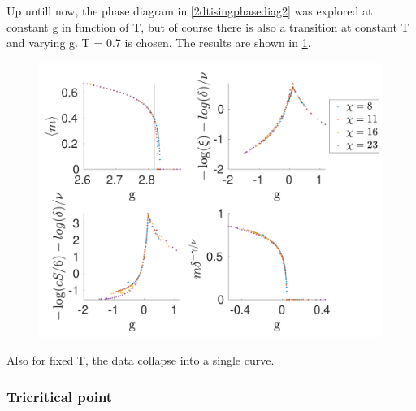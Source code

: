 Up untill now, the phase diagram in \cref{2dtisingphasediag2} was explored at constant g in function of T, but of course there is also a transition at constant T and varying g.  T = 0.7 is chosen. The results are shown in \cref{fig:phase:t07:full}.

\begin{figure}
    \center
    \includegraphics[width=\textwidth]{Figuren/phasediag/t07/full.pdf}
    \caption{  }
    \label{fig:phase:t07:full}
\end{figure}

Also for fixed T, the data collapse into a single curve.

\subsubsection{Tricritical point }


